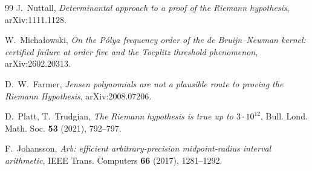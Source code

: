 \documentclass[11pt]{amsart}
\theoremstyle{definition}
\theoremstyle{remark}
\begin{document}
\begin{thebibliography}{99}
 J.~Nuttall,
\emph{Determinantal approach to a proof of the Riemann hypothesis},
arXiv:1111.1128.

 W.~Micha{\l}owski,
\emph{On the P\'olya frequency order of the de Bruijn--Newman kernel:
certified failure at order five and the Toeplitz threshold phenomenon},
arXiv:2602.20313.

 D.~W.~Farmer,
\emph{Jensen polynomials are not a plausible route to proving the
Riemann Hypothesis}, arXiv:2008.07206.

 D.~Platt, T.~Trudgian,
\emph{The Riemann hypothesis is true up to $3\cdot10^{12}$},
Bull. Lond. Math. Soc. \textbf{53} (2021), 792--797.

 F.~Johansson,
\emph{Arb: efficient arbitrary-precision midpoint-radius interval
arithmetic}, IEEE Trans. Computers \textbf{66} (2017), 1281--1292.

\end{thebibliography}
\end{document}
